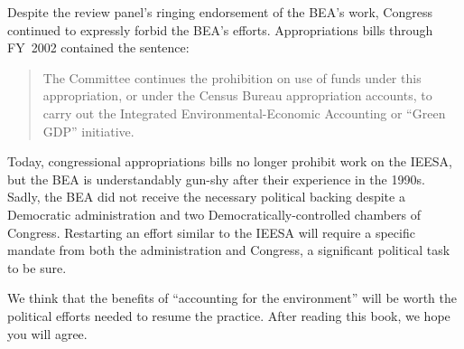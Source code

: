 Despite the review panel's ringing endorsement of the BEA's work,
Congress continued to expressly forbid the BEA's efforts.
Appropriations bills through FY~2002 contained the sentence:

\begin{quote}
	The Committee continues the prohibition on use of funds under this appropriation,
	or under the Census Bureau appropriation accounts,
	to carry out the Integrated Environmental-Economic Accounting or ``Green GDP'' initiative.
\end{quote}

Today, congressional appropriations bills no longer prohibit work on the IEESA,
but the BEA is understandably gun-shy after their experience in the 1990s.
Sadly, the BEA did not receive the necessary political backing
despite a Democratic administration
and two Democratically-controlled chambers of Congress.
Restarting an effort similar to the IEESA will require a specific
mandate from both the administration and Congress, 
a significant political task to be sure.

We think that the benefits of ``accounting for the environment''
will be worth the political efforts needed
to resume the practice.
After reading this book, we hope you will agree.


% 
% 
% 
% 

